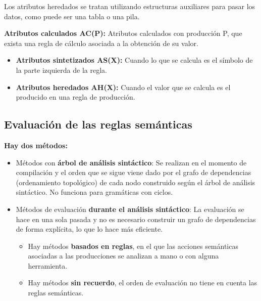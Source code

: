 \documentclass[12pt, twoside, openright]{report} %
\begin{document}
Los atributos heredados se tratan utilizando estructuras auxiliares para pasar los datos, como puede ser una tabla o una pila.

\textbf{Atributos calculados AC(P):} Atributos calculados con producción P, que exista una regla de cálculo asociada a la obtención de su valor.
\begin{itemize}
  \item \textbf{Atributos sintetizados AS(X):} Cuando lo que se calcula es el símbolo de la parte izquierda de la regla.
  \item \textbf{Atributos heredados AH(X):} Cuando el valor que se calcula es el producido en una regla de producción.
\end{itemize}
\pagebreak
\subsection{Evaluación de las reglas semánticas}
\textbf{Hay dos métodos:}
\begin{itemize}
  \item Métodos con \textbf{árbol de análisis sintáctico}: Se realizan en el momento de compilación y el orden que se sigue viene dado por el grafo de dependencias (ordenamiento topológico) de cada nodo construido según el árbol de análisis sintáctico. No funciona para gramáticas con ciclos.
  \item Métodos de evaluación \textbf{durante el análisis sintáctico}: La evaluación se hace en una sola pasada y no es necesario construir un grafo de dependencias de forma explícita, lo que lo hace más eficiente. 
  \begin{itemize}
    \item Hay métodos \textbf{basados en reglas}, en el que las acciones semánticas asociadas a las producciones se analizan a mano o con alguna herramienta.
    \item Hay métodos \textbf{sin recuerdo}, el orden de evaluación no tiene en cuenta las reglas semánticas.
  \end{itemize}
\end{itemize}
\end{document}
